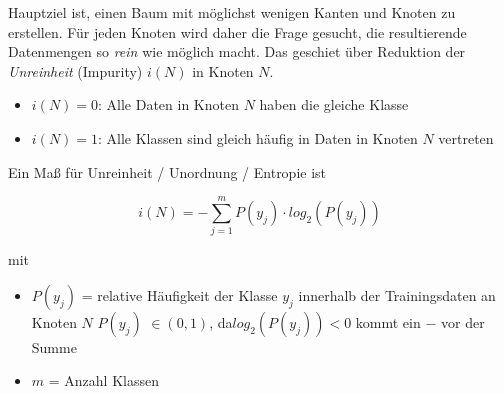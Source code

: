 \documentclass{report}
\begin{document}
  Hauptziel ist, einen Baum mit möglichst wenigen Kanten und Knoten zu erstellen. Für jeden Knoten wird daher die Frage gesucht,	
  die resultierende Datenmengen so \textit{rein} wie möglich macht. Das geschiet über Reduktion der \textit{Unreinheit} (Impurity)	
  $i(N)$ in Knoten $N$.\\	
  \vspace*{-1.5em}	
  \begin{itemize}	
    \item $i(N) = 0$: Alle Daten in Knoten $N$ haben die gleiche Klasse	
    \item $i(N) = 1$: Alle Klassen sind gleich häufig in Daten in Knoten $N$ vertreten	
  \end{itemize}	
  
  Ein Maß für Unreinheit / Unordnung / Entropie ist	
  
  $$i(N) = -\sum_{j=1}^mP(y_j)\cdot log_2(P(y_j))$$	
  
  mit\\	
  \vspace*{-1.5em}	
  \begin{itemize}	
    \item $P(y_j)$ = relative Häufigkeit der Klasse $y_j$ innerhalb der Trainingsdaten an Knoten $N$	
    \subitem $P(y_j)$ $\in (0, 1)$, da$log_2(P(y_j)) < 0$ kommt ein $-$ vor der Summe	
    \item $m$ = Anzahl Klassen	
  \end{itemize}	
  
\end{document}
